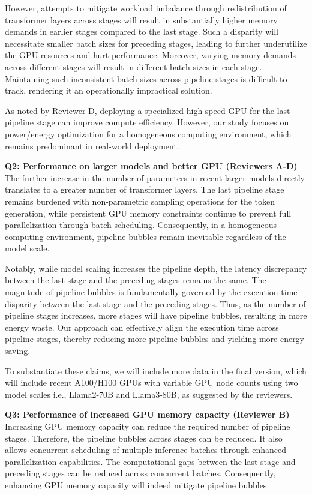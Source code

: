 However, attempts to mitigate workload imbalance through redistribution of transformer layers across stages will result in substantially higher memory demands in earlier stages compared to the last stage. 
Such a disparity will necessitate smaller batch sizes for preceding stages, leading to further underutilize the GPU resources and hurt performance. 
Moreover, varying memory demands across different stages will result in different batch sizes in each stage.
Maintaining such inconsistent batch sizes across pipeline stages is difficult to track, rendering it an operationally impractical solution.

As noted by Reviewer D, deploying a specialized high-speed GPU for the last pipeline stage can improve compute efficiency. 
However, our study focuses on power/energy optimization for a homogeneous computing environment, which remains predominant in real-world deployment.





\textbf{Q2: Performance on larger models and better GPU (Reviewers A-D)}
The further increase in the number of parameters in recent larger models directly translates to a greater number of transformer layers. 
The last pipeline stage remains burdened with non-parametric sampling operations for the token generation, while persistent GPU memory constraints continue to prevent full parallelization through batch scheduling.
Consequently, in a homogeneous computing environment, pipeline bubbles remain inevitable regardless of the model scale.

Notably, while model scaling increases the pipeline depth, the latency discrepancy between the last stage and the preceding stages remains the same.
The magnitude of pipeline bubbles is fundamentally governed by the execution time disparity between the last stage and the preceding stages. 
Thus, as the number of pipeline stages increases, more stages will have pipeline bubbles, resulting in more energy waste.
Our approach can effectively align the execution time across pipeline stages, thereby reducing more pipeline bubbles and yielding more energy saving.

To substantiate these claims, we will include more data in the final version, which will include recent A100/H100 GPUs with variable GPU node counts using two model scales i.e., Llama2-70B and Llama3-80B, as suggested by the reviewers.

\textbf{Q3: Performance of increased GPU memory capacity (Reviewer B)}
Increasing GPU memory capacity can reduce the required number of pipeline stages.
Therefore, the pipeline bubbles across stages can be reduced.
It also allows concurrent scheduling of multiple inference batches through enhanced parallelization capabilities. 
The computational gaps between the last stage and preceding stages can be reduced across concurrent batches. 
Consequently, enhancing GPU memory capacity will indeed mitigate pipeline bubbles.

